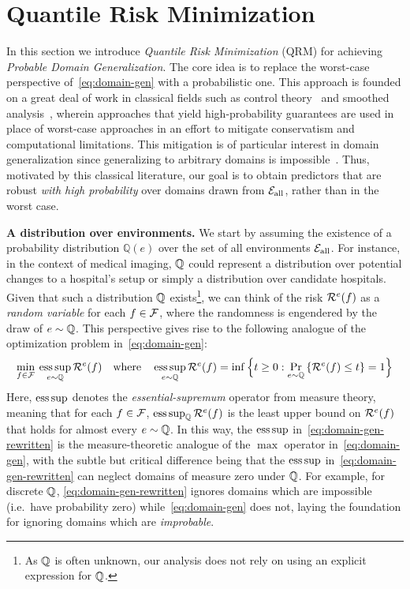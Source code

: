 \documentclass{article}
\begin{document}
%


\section{Quantile Risk Minimization}
\label{sec:qrm}
In this section we introduce 
%
\textit{Quantile Risk Minimization} (QRM) for achieving \textit{Probable Domain Generalization}. The core idea
%
is to replace the worst-case perspective
%
of~\eqref{eq:domain-gen} with a probabilistic one. This approach is founded on a great deal of work in classical fields such as control theory~\cite{campi2008exact,ramponi2018consistency} and smoothed analysis~\cite{spielman2004smoothed}, wherein approaches that yield high-probability guarantees are used in place of worst-case approaches in an effort to mitigate conservatism and computational limitations.
%
This mitigation is of particular interest in domain generalization
%
since generalizing to arbitrary domains is impossible~\cite{krueger21rex,ben2010theory,christiansen2021causal}.
%
Thus,
%
motivated by this classical literature, our goal is to obtain predictors that are robust \emph{with high probability} over domains drawn from ${\mathcal{E}_\text{all}}$, rather than in the worst case.  

\textbf{A distribution over environments.} We start by assuming the existence of
%
a probability distribution $\mathbb{Q}(e)$ over the set of all environments ${\mathcal{E}_\text{all}}$. 
%
%
%
%
For instance, in the context of medical imaging, $\mathbb{Q}$ could represent a distribution over potential changes to a hospital's setup or simply a distribution over candidate hospitals.
%
Given that such a distribution $\mathbb{Q}$ exists\footnote{As $\mathbb{Q}$ is often unknown, our analysis does not rely on using an explicit expression for $\mathbb{Q}$.}, we can think of the risk $\mathcal{R}^e(f)$ as a \emph{random variable} for each $f\in\mathcal{F}$, where the randomness is engendered by the draw of $e\sim\mathbb{Q}$.  This perspective gives rise to the following analogue of the optimization problem in~\eqref{eq:domain-gen}:
%
\begin{equation}
  \min_{f\in\mathcal{F}} \: \operatorname*{ess\,sup}_{e\sim\mathbb{Q}} \mathcal{R}^e(f) \quad\text{where}\quad \operatorname*{ess\,sup}_{e\sim\mathbb{Q}} \mathcal{R}^e(f) = \inf\Big\{ t\geq 0 : \Pr_{e\sim\mathbb{Q}} \left\{\mathcal{R}^e(f) \leq t\right\} = 1\Big\} \label{eq:domain-gen-rewritten}
\end{equation}
%
Here, $\operatorname*{ess\,sup}$ denotes the \emph{essential-supremum} operator from measure theory, meaning that for each $f\in\mathcal{F}$, $\operatorname*{ess\,sup}_{\mathbb{Q}} \mathcal{R}^e(f)$ is the least upper bound on $\mathcal{R}^e(f)$ that holds for almost every $e\sim\mathbb{Q}$.  In this way, the $\operatorname*{ess\,sup}$ in~\eqref{eq:domain-gen-rewritten} is the measure-theoretic analogue of the $\max$ operator in~\eqref{eq:domain-gen}, with the subtle but critical difference being that the $\operatorname*{ess\,sup}$ in~\eqref{eq:domain-gen-rewritten} can neglect domains of measure zero under $\mathbb{Q}$. For example, for discrete $\mathbb{Q}$, \eqref{eq:domain-gen-rewritten} ignores domains which are impossible (i.e.\ have probability zero) while~\eqref{eq:domain-gen} does not, laying the foundation for ignoring domains which are \emph{improbable}.
\end{document}
